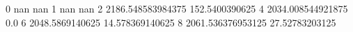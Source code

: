 0 nan nan
1 nan nan
2 2186.548583984375 152.5400390625
4 2034.008544921875 0.0
6 2048.5869140625 14.578369140625
8 2061.536376953125 27.52783203125
